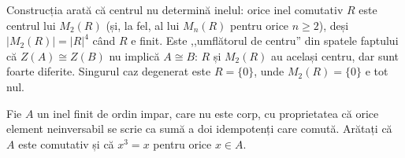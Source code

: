 \begin{obs}
Construcția arată că centrul nu determină inelul: orice inel
comutativ $R$ este centrul lui $M_{2}(R)$ (și, la fel, al lui
$M_{n}(R)$ pentru orice $n\ge 2$), deși $|M_{2}(R)|=|R|^{4}$ când $R$
e finit. Este ,,umflătorul de centru'' din spatele faptului că
$Z(A)\cong Z(B)$ nu implică $A\cong B$: $R$ și $M_{2}(R)$ au același
centru, dar sunt foarte diferite. Singurul caz degenerat este $R=\{0\}$, unde
$M_{2}(R)=\{0\}$ e tot nul.
\end{obs}

\begin{problema}
Fie $A$ un inel finit de ordin impar, care nu este corp, cu proprietatea
că orice element neinversabil se scrie ca sumă a doi idempotenți care
comută. Arătați că $A$ este comutativ și că $x^{3}=x$ pentru orice
$x\in A$.
\end{problema}

